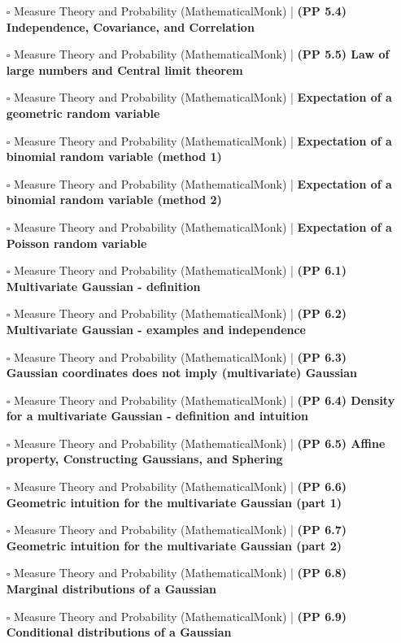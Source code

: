 \documentclass[a4, landscape, 12pt]{article}
\newcommand{\checkbox}{$\square$}%
\begin{document}
\begin{itemize}
{}
\item [\checkbox] Measure Theory and Probability (MathematicalMonk)  | \textbf{(PP 5.4) Independence, Covariance, and Correlation
}
\item [\checkbox] Measure Theory and Probability (MathematicalMonk)  | \textbf{(PP 5.5) Law of large numbers and Central limit theorem
}
\item [\checkbox] Measure Theory and Probability (MathematicalMonk)  | \textbf{Expectation of a geometric random variable
}
\item [\checkbox] Measure Theory and Probability (MathematicalMonk)  | \textbf{Expectation of a binomial random variable (method 1)
}
\item [\checkbox] Measure Theory and Probability (MathematicalMonk)  | \textbf{Expectation of a binomial random variable (method 2)
}
\item [\checkbox] Measure Theory and Probability (MathematicalMonk)  | \textbf{Expectation of a Poisson random variable
}
\item [\checkbox] Measure Theory and Probability (MathematicalMonk)  | \textbf{(PP 6.1) Multivariate Gaussian - definition
}
\item [\checkbox] Measure Theory and Probability (MathematicalMonk)  | \textbf{(PP 6.2) Multivariate Gaussian - examples and independence
}
\item [\checkbox] Measure Theory and Probability (MathematicalMonk)  | \textbf{(PP 6.3) Gaussian coordinates does not imply (multivariate) Gaussian
}
\item [\checkbox] Measure Theory and Probability (MathematicalMonk)  | \textbf{(PP 6.4) Density for a multivariate Gaussian - definition and intuition
}
\item [\checkbox] Measure Theory and Probability (MathematicalMonk)  | \textbf{(PP 6.5) Affine property, Constructing Gaussians, and Sphering
}
\item [\checkbox] Measure Theory and Probability (MathematicalMonk)  | \textbf{(PP 6.6) Geometric intuition for the multivariate Gaussian (part 1)
}
\item [\checkbox] Measure Theory and Probability (MathematicalMonk)  | \textbf{(PP 6.7) Geometric intuition for the multivariate Gaussian (part 2)
}
\item [\checkbox] Measure Theory and Probability (MathematicalMonk)  | \textbf{(PP 6.8) Marginal distributions of a Gaussian
}
\item [\checkbox] Measure Theory and Probability (MathematicalMonk)  | \textbf{(PP 6.9) Conditional distributions of a Gaussian
}
\end{itemize}
\end{document}
